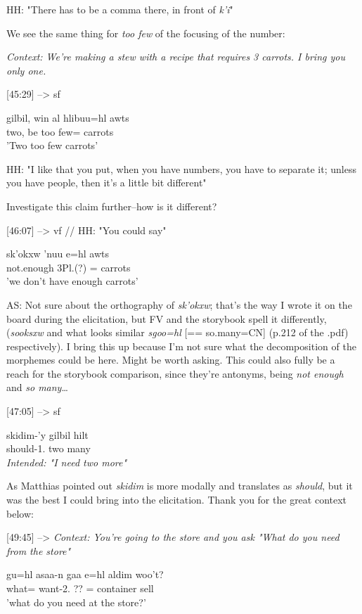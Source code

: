 \documentclass{article}
\begin{document}
HH: "There has to be a comma there, in front of \textit{k'i}"

We see the same thing for \textit{too few} of the focusing of the number:

\textit{Context: We're making a stew with a recipe that requires 3 carrots. I bring you only one.}

[45:29] --> sf
\begin{exe}
\ex \gll gilbil, win al hlibuu=hl awts\\
two, be too few=\Cn{} carrots\\
'Two too few carrots'
\end{exe}

HH: "I like that you put, when you have numbers, you have to separate it; unless you have people, then it's a little bit different"

Investigate this claim further--how is it different?

[46:07] --> vf // HH: "You could say"
\begin{exe}
\ex \gll sk'okxw 'nuu e=hl awts\\
not.enough 3Pl.\Iii{}(?) \Prep{}=\Cn{} carrots\\
'we don't have enough carrots'
\end{exe}

AS: Not sure about the orthography of \textit{sk'okxw}; that's the way I wrote it on the board during the elicitation, but FV and the storybook spell it differently, (\textit{sooksxw} and what looks similar \textit{sgoo=hl} [== so.many=CN] (p.212 of the .pdf) respectively). I bring this up because I'm not sure what the decomposition of the morphemes could be here. Might be worth asking.
This could also fully be a reach for the storybook comparison, since they're antonyms, being \textit{not enough} and \textit{so many}\dots

[47:05] --> sf
\begin{exe}
\ex \gll skidim-'y gilbil hilt\\
should-1.\Ii{} two many\\
\textit{Intended: "I need two more"}
\end{exe}

As Matthias pointed out \textit{skidim} is more modally and translates as \textit{should}, but it was the best I could bring into the elicitation. Thank you for the great context below:

[49:45] --> \textit{Context: You're going to the store and you ask "What do you need from the store"}
\begin{exe}
\ex \gll gu=hl asaa-n gaa e=hl aldim woo't?\\
what=\Cn{} want-2.\Ii{} ?? \Prep{}=\Cn{} container sell \\
'what do you need at the store?'
\end{exe}
\end{document}
